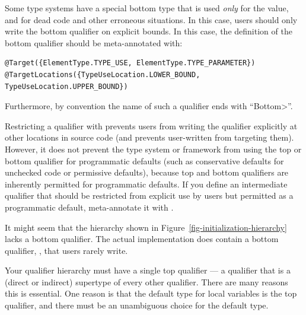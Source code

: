 
Some type systems have a special bottom type that is used \emph{only} for
the  value, and for dead code and other erroneous situations.
In this case, users should only write the bottom qualifier on explicit
bounds.  In this case, the definition of the bottom qualifier should be
meta-annotated with:

%
\begin{Verbatim}
@Target({ElementType.TYPE_USE, ElementType.TYPE_PARAMETER})
@TargetLocations({TypeUseLocation.LOWER_BOUND, TypeUseLocation.UPPER_BOUND})
\end{Verbatim}

Furthermore, by convention the name of such a qualifier ends with ``\<Bottom>''.

Restricting a qualifier with  prevents users from writing the qualifier explicitly at other locations in source code (and prevents user-written  from targeting them).
However, it does not prevent the type system or framework from using the top or bottom qualifier for programmatic defaults (such as conservative defaults for unchecked code or permissive defaults), because top and bottom qualifiers are inherently permitted for programmatic defaults.
If you define an intermediate qualifier that should be restricted from explicit use by users but permitted as a programmatic default, meta-annotate it with .

It might seem that the hierarchy shown in Figure~\ref{fig-initialization-hierarchy} lacks
a bottom qualifier.  The actual implementation does contain a bottom
qualifier, , that
users rarely write.


Your qualifier hierarchy must have a single top qualifier
--- a qualifier that is a (direct or indirect) supertype of every other
qualifier.
There are many reasons this is essential.
One reason is that the default type for local variables is the top
qualifier, and there must be an unambiguous choice for the default type.


